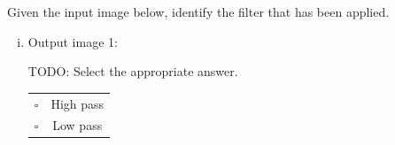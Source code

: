 \begin{enumerate}[(a)]
\begin{tcolorbox}[colback=orange!5!white,colframe=orange!75!black]
Given the input image below, identify the filter that has been applied.
\end{tcolorbox}


\begin{enumerate}[(i)]
\item
Output image 1:\\
\begin{tcolorbox}[colback=white!5!white,colframe=green!75!black]
TODO: Select the appropriate answer.

\begin{tabular}[h]{lc}
$\square$ & High pass \\
$\square$ & Low pass \\
\end{tabular}
\end{tcolorbox}


\end{enumerate}
\end{enumerate}
